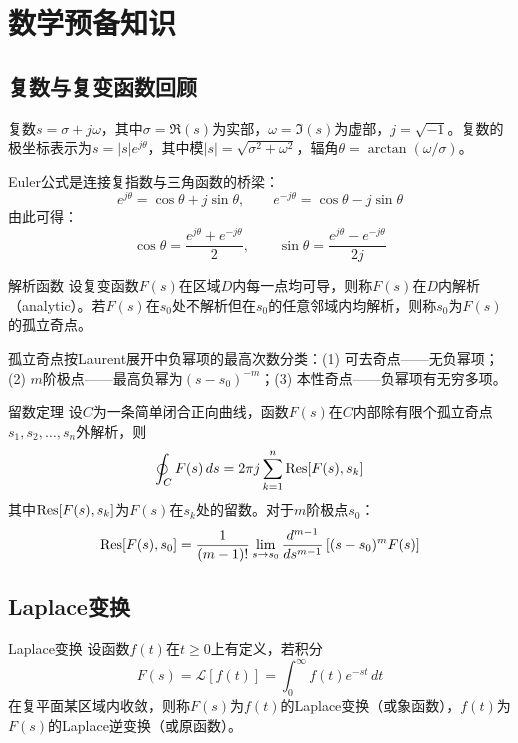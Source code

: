 \section{数学预备知识}

\subsection{复数与复变函数回顾}

复数$s = \sigma + j\omega$，其中$\sigma = \Re(s)$为实部，$\omega = \Im(s)$为虚部，$j = \sqrt{-1}$。复数的极坐标表示为$s = |s|e^{j\theta}$，其中模$|s| = \sqrt{\sigma^2 + \omega^2}$，辐角$\theta = \arctan(\omega/\sigma)$。

Euler公式是连接复指数与三角函数的桥梁：
\[
e^{j\theta} = \cos\theta + j\sin\theta, \qquad
e^{-j\theta} = \cos\theta - j\sin\theta
\]
由此可得：
\[
\cos\theta = \frac{e^{j\theta} + e^{-j\theta}}{2}, \qquad
\sin\theta = \frac{e^{j\theta} - e^{-j\theta}}{2j}
\]

\begin{mydefinition}{解析函数}
设复变函数$F(s)$在区域$D$内每一点均可导，则称$F(s)$在$D$内解析（analytic）。若$F(s)$在$s_0$处不解析但在$s_0$的任意邻域内均解析，则称$s_0$为$F(s)$的孤立奇点。
\end{mydefinition}

孤立奇点按Laurent展开中负幂项的最高次数分类：(1) 可去奇点——无负幂项；(2) $m$阶极点——最高负幂为$(s-s_0)^{-m}$；(3) 本性奇点——负幂项有无穷多项。

\begin{myTheorem}{留数定理}
设$C$为一条简单闭合正向曲线，函数$F(s)$在$C$内部除有限个孤立奇点$s_1,s_2,\dots,s_n$外解析，则
\[
\oint_C F(s)\,ds = 2\pi j \sum_{k=1}^{n} \operatorname{Res}[F(s), s_k]
\]
其中$\operatorname{Res}[F(s), s_k]$为$F(s)$在$s_k$处的留数。对于$m$阶极点$s_0$：
\[
\operatorname{Res}[F(s), s_0] = \frac{1}{(m-1)!} \lim_{s \to s_0} \frac{d^{m-1}}{ds^{m-1}}\left[(s-s_0)^m F(s)\right]
\]
\end{myTheorem}

\subsection{Laplace变换}

\begin{mydefinition}{Laplace变换}
设函数$f(t)$在$t \geq 0$上有定义，若积分
\[
F(s) = \mathcal{L}[f(t)] = \int_{0}^{\infty} f(t) e^{-st}\,dt
\]
在复平面某区域内收敛，则称$F(s)$为$f(t)$的Laplace变换（或象函数），$f(t)$为$F(s)$的Laplace逆变换（或原函数）。
\end{mydefinition}


